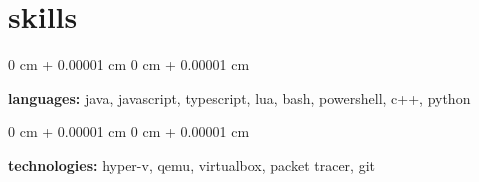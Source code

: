 \documentclass[10pt, letterpaper]{article}
\newenvironment{onecolentry}{
    \begin{adjustwidth}{
        0 cm + 0.00001 cm
    }{
        0 cm + 0.00001 cm
    }
}{
    \end{adjustwidth}
} %
\begin{document}
    
    \section{skills}



        
        \begin{onecolentry}
            \textbf{languages:} java, javascript, typescript, lua, bash, powershell, c++, python
        \end{onecolentry}

        \vspace{0.2 cm}

        \begin{onecolentry}
            \textbf{technologies:} hyper-v, qemu, virtualbox, packet tracer, git 
        \end{onecolentry}


    
\end{document}
